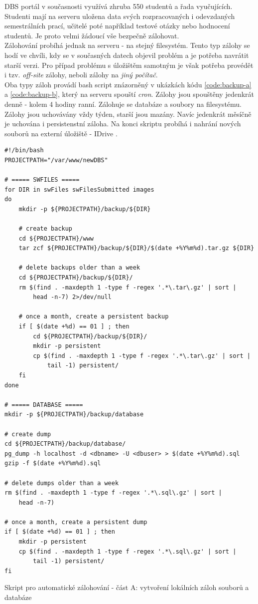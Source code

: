 DBS portál v současnosti využívá zhruba 550 studentů a řada vyučujících. Studenti mají na serveru uložena data svých rozpracovaných i odevzdaných semestrálních prací, učitelé poté například testové otázky nebo hodnocení studentů. Je proto velmi žádoucí vše bezpečně zálohovat.\\
Zálohování probíhá jednak na serveru - na stejný filesystém. Tento typ zálohy se hodí ve chvíli, kdy se v současných datech objevil problém a je potřeba navrátit starší verzi. Pro případ problému s úložištěm samotným je však potřeba provédět i tzv. \emph{off-site} zálohy, neboli zálohy na \emph{jiný počítač}.\\
Oba typy záloh provádí bash script znázorněný v ukázkách kódu \ref{code:backup-a} a \ref{code:backup-b}, který na serveru spouští \emph{cron}. Zálohy jsou spouštěny jedenkrát denně - kolem 4 hodiny ranní. Zálohuje se databáze a soubory na filesystému. Zálohy jsou uchovávány vždy týden, starší jsou mazány. Navíc jedenkrát měsíčně je uchována i persistenstní záloha. Na konci skriptu probíhá i nahrání nových souborů na externí úložiště - IDrive \cite{idrive}.
\begin{listing}[H]
	\begin{verbatim}
#!/bin/bash
PROJECTPATH="/var/www/newDBS"

# ===== SWFILES =====
for DIR in swFiles swFilesSubmitted images
do
    mkdir -p ${PROJECTPATH}/backup/${DIR}

    # create backup
    cd ${PROJECTPATH}/www
    tar zcf ${PROJECTPATH}/backup/${DIR}/$(date +%Y%m%d).tar.gz ${DIR}

    # delete backups older than a week
    cd ${PROJECTPATH}/backup/${DIR}/
    rm $(find . -maxdepth 1 -type f -regex '.*\.tar\.gz' | sort |
        head -n-7) 2>/dev/null

    # once a month, create a persistent backup
    if [ $(date +%d) == 01 ] ; then
        cd ${PROJECTPATH}/backup/${DIR}/
        mkdir -p persistent
        cp $(find . -maxdepth 1 -type f -regex '.*\.tar\.gz' | sort |
            tail -1) persistent/
    fi
done

# ===== DATABASE =====
mkdir -p ${PROJECTPATH}/backup/database

# create dump
cd ${PROJECTPATH}/backup/database/
pg_dump -h localhost -d <dbname> -U <dbuser> > $(date +%Y%m%d).sql
gzip -f $(date +%Y%m%d).sql

# delete dumps older than a week
rm $(find . -maxdepth 1 -type f -regex '.*\.sql\.gz' | sort |
    head -n-7)

# once a month, create a persistent dump
if [ $(date +%d) == 01 ] ; then
    mkdir -p persistent
    cp $(find . -maxdepth 1 -type f -regex '.*\.sql\.gz' | sort |
        tail -1) persistent/
fi
	\end{verbatim}
	\caption{Skript pro automatické zálohování - část A: vytvoření lokálních záloh souborů a databáze} \label{code:backup-a}
\end{listing}

